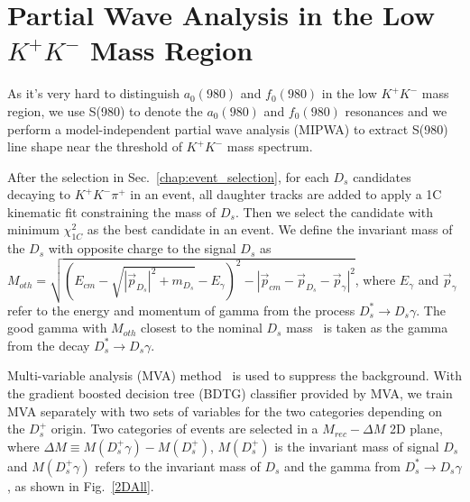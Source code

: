 %


\section{Partial Wave Analysis in the Low $K^{+}K^{-}$ Mass Region}
\label{Amplitude Analysis}
As it's very hard to distinguish $a_{0}(980)$ and $f_{0}(980)$ in the low $K^{+}K^{-}$ mass region, we use S(980) to denote the $a_{0}(980)$ and $f_{0}(980)$ resonances and we perform a model-independent partial wave analysis (MIPWA) to extract S(980) line shape near the threshold of $K^{+}K^{-}$ mass spectrum.

After the selection in Sec.~\ref{chap:event_selection}, for each $D_{s}$ candidates decaying to  $K^{+}K^{-}\pi^{+}$ in an event, all daughter tracks are added to apply a 1C kinematic fit constraining the mass of $D_{s}$.
Then we select the candidate with minimum $\chi^{2}_{1C}$ as the best candidate in an event.
We define the invariant mass of the $D_{s}$ with opposite charge to the signal $D_{s}$ as $M_{oth} = \sqrt{ (E_{cm} - \sqrt{| \vec p_{D_{s}} |^{2} + m_{D_{s}}} - E_{\gamma})^{2} - |\vec p_{cm} - \vec p_{D_{s}} - \vec p_{\gamma}| ^{2}   }$, where $E_{\gamma}$ and $\vec p_{\gamma}$ refer to the energy and momentum of gamma from the process $D_{s}^{*} \rightarrow D_{s}\gamma$.
The good gamma with $M_{oth}$ closest to the nominal $D_{s}$  mass~\cite{PDG} is taken as the gamma from the decay $D_{s}^{*} \rightarrow D_{s}\gamma$.

Multi-variable analysis (MVA) method~\cite{TMVA} is used to suppress the background.
With the gradient boosted decision tree (BDTG) classifier provided by MVA, we train MVA separately with two sets of variables for the two categories depending on the $D_{s}^{+}$ origin.
Two categories of events are selected in a $M_{rec} - \Delta M$ 2D plane, where $\Delta M \equiv M(D_{s}^{+}\gamma) - M(D_{s}^{+})$, $M(D_{s}^{+})$ is the invariant mass of signal $D_{s}$ and $M(D_{s}^{+}\gamma)$ refers to the invariant mass of $D_{s}$ and the gamma from $D_{s}^{*} \rightarrow D_{s}\gamma$, as shown in Fig.~\ref{2DAll}.

